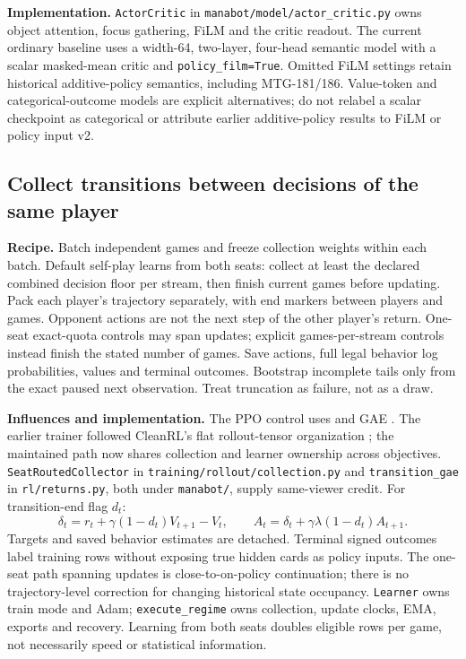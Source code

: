 \documentclass[11pt]{article}
\newcommand{\code}[1]{\texttt{\small #1}}
\begin{document}
\textbf{Implementation.} \code{ActorCritic} in \code{manabot/model/actor\_critic.py} owns object attention, focus gathering, FiLM and the critic readout. The current ordinary baseline uses a width-64, two-layer, four-head semantic model with a scalar masked-mean critic and \code{policy\_film=True}. Omitted FiLM settings retain historical additive-policy semantics, including MTG-181/186. Value-token and categorical-outcome models are explicit alternatives; do not relabel a scalar checkpoint as categorical or attribute earlier additive-policy results to FiLM or policy input v2.

\subsection{Collect transitions between decisions of the same player}

\textbf{Recipe.} Batch independent games and freeze collection weights within each batch. Default self-play learns from both seats: collect at least the declared combined decision floor per stream, then finish current games before updating. Pack each player's trajectory separately, with end markers between players and games. Opponent actions are not the next step of the other player's return. One-seat exact-quota controls may span updates; explicit games-per-stream controls instead finish the stated number of games. Save actions, full legal behavior log probabilities, values and terminal outcomes. Bootstrap incomplete tails only from the exact paused next observation. Treat truncation as failure, not as a draw.

\textbf{Influences and implementation.} The PPO control uses \citet{schulman2017ppo} and GAE \citep{schulman2015gae}. The earlier trainer followed CleanRL's flat rollout-tensor organization \citep{cleanrlcode}; the maintained path now shares collection and learner ownership across objectives. \code{SeatRoutedCollector} in \code{training/rollout/collection.py} and \code{transition\_gae} in \code{rl/returns.py}, both under \code{manabot/}, supply same-viewer credit. For transition-end flag $d_t$:
\[
 \delta_t=r_t+\gamma(1-d_t)V_{t+1}-V_t,\qquad
 A_t=\delta_t+\gamma\lambda(1-d_t)A_{t+1}.
\]
Targets and saved behavior estimates are detached. Terminal signed outcomes label training rows without exposing true hidden cards as policy inputs. The one-seat path spanning updates is close-to-on-policy continuation; there is no trajectory-level correction for changing historical state occupancy. \code{Learner} owns train mode and Adam; \code{execute\_regime} owns collection, update clocks, EMA, exports and recovery. Learning from both seats doubles eligible rows per game, not necessarily speed or statistical information.
\end{document}
